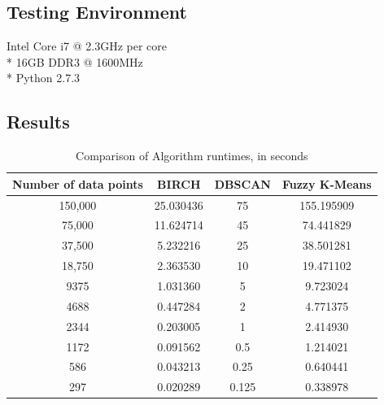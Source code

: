 \documentclass[conference, 10pt]{IEEEtran}
\begin{document}
  \subsection{Testing Environment}
  \begin{center}
  Intel Core i7 @ 2.3GHz per core\\*
  16GB DDR3 @ 1600MHz\\*
  Python 2.7.3
  \end{center}

  \subsection{Results}

  \begin{table}[h]
  \begin{center}
  \caption{Comparison of Algorithm runtimes, in seconds} \label{Table1Label}
  \begin{tabular}{|c|c|c|c|}
   \hline
   Number of data points & BIRCH & DBSCAN& Fuzzy K-Means \\
   \hline
   150,000 & 25.030436 & 75 & 155.195909\\
   \hline
   75,000 & 11.624714 & 45 & 74.441829\\
   \hline
   37,500 & 5.232216 & 25 & 38.501281\\
   \hline
   18,750 & 2.363530 & 10 & 19.471102\\
   \hline
   9375 & 1.031360 & 5 & 9.723024\\
   \hline
   4688 & 0.447284 & 2 & 4.771375\\
   \hline
   2344 & 0.203005 & 1 & 2.414930\\
   \hline
   1172 & 0.091562 & 0.5 & 1.214021\\
   \hline
   586 & 0.043213 & 0.25 & 0.640441\\
   \hline
   297 & 0.020289 & 0.125 & 0.338978\\
   \hline
  \end{tabular}
  \end{center}
  \end{table}

\end{document}
